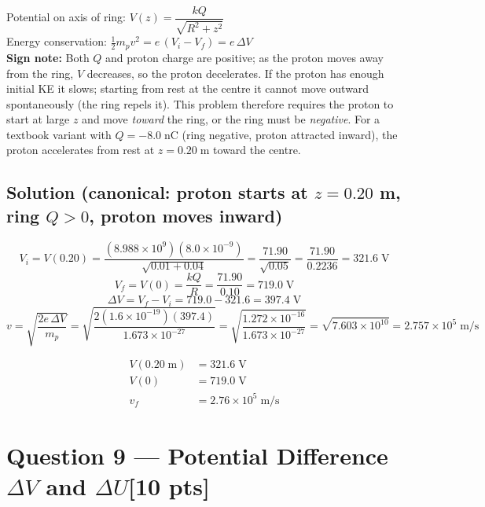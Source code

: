 \documentclass[12pt,letterpaper]{article}
\newcommand{\units}[1]{\;\text{#1}}
\newcommand{\pts}[1]{\hfill\textcolor{TorontoBlue60}{[#1 pts]}}
\begin{document}
\begin{tcolorbox}[principbox]
Potential on axis of ring: $V(z) = \dfrac{kQ}{\sqrt{R^2+z^2}}$\\
Energy conservation: $\tfrac{1}{2}m_p v^2 = e\,(V_i - V_f) = e\,\Delta V$\\
\textbf{Sign note:} Both $Q$ and proton charge are positive; as the proton moves away
from the ring, $V$ decreases, so the proton decelerates. If the proton has enough
initial KE it slows; starting from rest at the centre it cannot move outward spontaneously
(the ring repels it). This problem therefore requires the proton to start at large $z$
and move \emph{toward} the ring, or the ring must be \emph{negative}. For a textbook
variant with $Q = -8.0\units{nC}$ (ring negative, proton attracted inward), the proton
accelerates from rest at $z=0.20\units{m}$ toward the centre.
\end{tcolorbox}

\subsection*{Solution (canonical: proton starts at $z = 0.20$ m, ring $Q > 0$, proton moves inward)}

\[
  V_i = V(0.20) = \frac{(8.988\times10^9)(8.0\times10^{-9})}{\sqrt{0.01+0.04}}
               = \frac{71.90}{\sqrt{0.05}} = \frac{71.90}{0.2236} = 321.6\units{V}
\]
\[
  V_f = V(0) = \frac{kQ}{R} = \frac{71.90}{0.10} = 719.0\units{V}
\]
\[
  \Delta V = V_f - V_i = 719.0 - 321.6 = 397.4\units{V}
\]
\[
  v = \sqrt{\frac{2e\,\Delta V}{m_p}}
    = \sqrt{\frac{2(1.6\times10^{-19})(397.4)}{1.673\times10^{-27}}}
    = \sqrt{\frac{1.272\times10^{-16}}{1.673\times10^{-27}}}
    = \sqrt{7.603\times10^{10}} = 2.757\times10^{5}\units{m/s}
\]

\begin{tcolorbox}[answerbox]
\begin{align*}
  V(0.20\units{m}) &= 321.6\units{V} \\
  V(0)             &= 719.0\units{V} \\
  v_f              &= 2.76\times10^{5}\units{m/s}
\end{align*}
\end{tcolorbox}

\newpage

\section{Question 9 --- Potential Difference $\Delta V$ and $\Delta U$\pts{10}}
\label{sec:q9}
\end{document}
